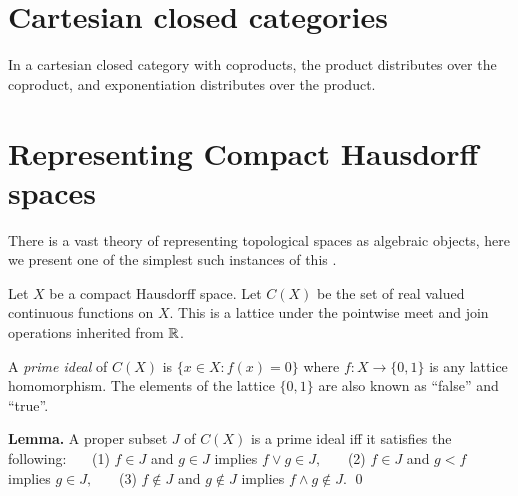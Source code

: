 \documentclass[11pt]{article}
\begin{document}
%
%

\section{Cartesian closed categories}

In a cartesian closed category with coproducts, 
the product distributes over the coproduct, and exponentiation distributes over the product.


%
%

\section{Representing Compact Hausdorff spaces}


There is a vast theory of representing topological spaces as
algebraic objects, here we present one of the simplest such
instances of this
\cite{Nagata1985}.


Let $X$ be a compact Hausdorff space.
Let $C(X)$ be the set of real valued continuous functions on $X$.
This is a lattice under the pointwise meet and join operations inherited from $\mathbb R$.

A \emph{prime ideal} of $C(X)$ is $\{x\in X:f(x)=0\}$ where $f:X\to \{0,1\}$
is any lattice homomorphism. 
The elements of the lattice $\{0, 1\}$ are also known as 
``false'' and ``true''.

{\bf Lemma.} A proper subset $J$ of $C(X)$ is a prime ideal
iff it satisfies the following:\newline
\ \ \ (1) $f\in J$ and $g\in J$ implies $f\vee g \in J,$ \newline
\ \ \ (2) $f\in J$ and $g<f$ implies $g\in J,$ \newline
\ \ \ (3) $f\notin J$ and $g\notin J$ implies $f\wedge g\notin J.$
\qed
\end{document}
